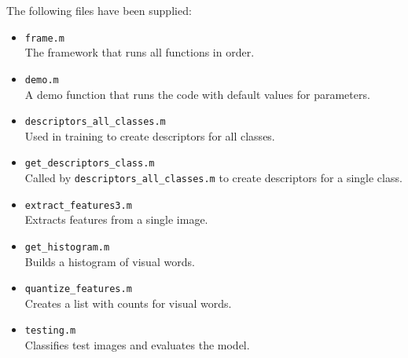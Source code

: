 The following files have been supplied:\\

\begin{itemize}
\item \verb|frame.m|\\
The framework that runs all functions in order.
\item \verb|demo.m|\\
A demo function that runs the code with default values for parameters.
\item \verb|descriptors_all_classes.m|\\
Used in training to create descriptors for all classes.
\item \verb|get_descriptors_class.m|\\
Called by \verb|descriptors_all_classes.m| to create descriptors for a single class.
\item \verb|extract_features3.m|\\
Extracts features from a single image.
\item \verb|get_histogram.m| \\
Builds a histogram of visual words.
\item \verb|quantize_features.m| \\
Creates a list with counts for visual words.
\item \verb|testing.m|\\
Classifies test images and evaluates the model.
\end{itemize}